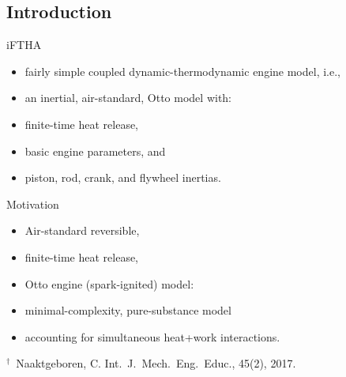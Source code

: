 \subsection{Introduction}

    \begin{frame}{iFTHA}\vspace*{-2em}
        \vspace*\medskipamount
        \begin{itemize}
            \item<1->  fairly simple \alert{coupled dynamic-thermodynamic} engine model, i.e.,
            \item<1->  an \alert{inertial}, \alert{air-standard}, Otto model with:
            \item<1->  \alert{finite-time} heat release,
            \item<1->  basic \alert{engine parameters}, and
            \item<1->  \alert{piston}, \alert{rod}, \alert{crank}, and \alert{flywheel}
                inertias.
        \end{itemize}
    \end{frame}

    \begin{frame}{Motivation}\vspace*{-2em}
        \vspace*\medskipamount
        \begin{itemize}
            \item<1->  \alert{Air-standard reversible},
            \item<1->  \alert{finite-time} heat release,
            \item<1->  Otto engine (spark-ignited) model:
            \item<1->  \alert{minimal-complexity}, \alert{pure-substance} model
            \item<1->  accounting for \alert{simultaneous heat+work} interactions.
        \end{itemize}\vspace*\medskipamount
        {\scriptsize
        $^\dagger$~Naaktgeboren, C. Int.~J.~Mech.~Eng.~Educ., 45(2), 2017.}
    \end{frame}


